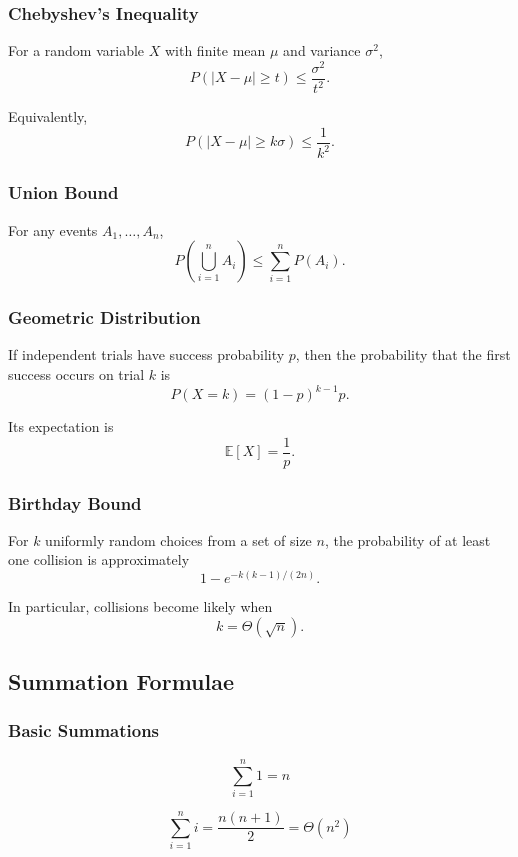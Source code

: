 \documentclass[11pt]{article}
\begin{document}
\subsubsection{Chebyshev's Inequality}

For a random variable $X$ with finite mean $\mu$ and variance $\sigma^2$,
\[
P(|X-\mu|\geq t)
\leq
\frac{\sigma^2}{t^2}.
\]

Equivalently,
\[
P(|X-\mu|\geq k\sigma)
\leq
\frac1{k^2}.
\]

\subsubsection{Union Bound}

For any events $A_1,\ldots,A_n$,
\[
P\left(\bigcup_{i=1}^n A_i\right)
\leq
\sum_{i=1}^nP(A_i).
\]

\subsubsection{Geometric Distribution}

If independent trials have success probability $p$, then the probability that the first success occurs on trial $k$ is
\[
P(X=k)=(1-p)^{k-1}p.
\]

Its expectation is
\[
\mathbb E[X]=\frac1p.
\]

\subsubsection{Birthday Bound}

For $k$ uniformly random choices from a set of size $n$, the probability of at least one collision is approximately
\[
1-e^{-k(k-1)/(2n)}.
\]

In particular, collisions become likely when
\[
k=\Theta(\sqrt n).
\]

\subsection{Summation Formulae}

\subsubsection{Basic Summations}

\[
\sum_{i=1}^{n} 1 = n
\]

\[
\sum_{i=1}^{n} i = \frac{n(n+1)}{2} = \Theta(n^2)
\]
\end{document}
